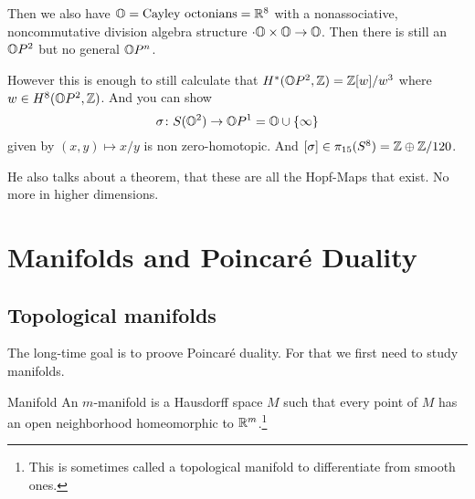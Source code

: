 \documentclass[language=english]{TemplateLecture}
\begin{document}
Then we also have \(\mathbb{O} = \text{Cayley octonians} = \mathbb{R}^8\) with a nonassociative, noncommutative division algebra structure \(\cdot \mathbb{O} \times \mathbb{O} \to \mathbb{O}\). Then there is still an \(\mathbb{O} P^2\) but no general \(\mathbb{O} P^n\).

However this is enough to still calculate that \(H^*(\mathbb{O} P^2, \mathbb{Z}) = \mathbb{Z}[w]/w^3\) where \(w \in H^8(\mathbb{O} P^2, \mathbb{Z})\). And you can show
\[\sigma \colon S(\mathbb{O}^2) \to \mathbb{O} P^1 = \mathbb{O} \cup \{\infty\}\]
given by \((x,y) \mapsto x/y\) is non zero-homotopic. And \([\sigma] \in \pi_{15}(S^8) = \mathbb{Z} \oplus \mathbb{Z}/120\).

He also talks about a theorem, that these are all the Hopf-Maps that exist. No more in higher dimensions.


\part{Manifolds and Poincaré Duality}

\chapter{Topological manifolds}

The long-time goal is to proove Poincaré duality. For that we first need to study manifolds.

\begin{defi}{Manifold}{}
    An \(m\)-manifold  is a Hausdorff space \(M\) such that every point of \(M\) has an open neighborhood homeomorphic to \(\mathbb{R}^m\).\footnote{This is sometimes called a topological manifold to differentiate from smooth ones.}
\end{defi}
\end{document}
